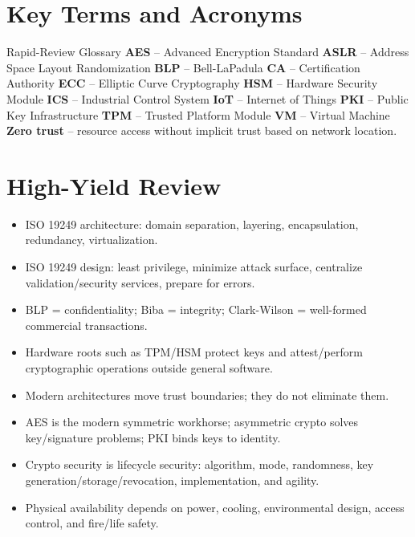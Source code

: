 \documentclass[10pt,letterpaper]{article}
\begin{document}
\section{Key Terms and Acronyms}
\begin{summarybox}{Rapid-Review Glossary}
\textbf{AES} -- Advanced Encryption Standard \quad
\textbf{ASLR} -- Address Space Layout Randomization \quad
\textbf{BLP} -- Bell-LaPadula \quad
\textbf{CA} -- Certification Authority \quad
\textbf{ECC} -- Elliptic Curve Cryptography \quad
\textbf{HSM} -- Hardware Security Module \quad
\textbf{ICS} -- Industrial Control System \quad
\textbf{IoT} -- Internet of Things \quad
\textbf{PKI} -- Public Key Infrastructure \quad
\textbf{TPM} -- Trusted Platform Module \quad
\textbf{VM} -- Virtual Machine \quad
\textbf{Zero trust} -- resource access without implicit trust based on network location.
\end{summarybox}

\section{High-Yield Review}
\begin{itemize}
\item ISO 19249 architecture: domain separation, layering, encapsulation, redundancy, virtualization.
\item ISO 19249 design: least privilege, minimize attack surface, centralize validation/security services, prepare for errors.
\item BLP = confidentiality; Biba = integrity; Clark-Wilson = well-formed commercial transactions.
\item Hardware roots such as TPM/HSM protect keys and attest/perform cryptographic operations outside general software.
\item Modern architectures move trust boundaries; they do not eliminate them.
\item AES is the modern symmetric workhorse; asymmetric crypto solves key/signature problems; PKI binds keys to identity.
\item Crypto security is lifecycle security: algorithm, mode, randomness, key generation/storage/revocation, implementation, and agility.
\item Physical availability depends on power, cooling, environmental design, access control, and fire/life safety.
\end{itemize}
\end{document}
